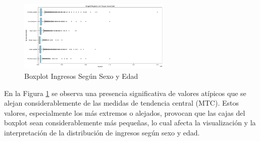 \documentclass{article}
\begin{document}
	\FloatBarrier
	
	\begin{figure}[htbp]
		\centering
		\includegraphics[width=0.65\textwidth]{../output/fig/BoxIngSexoEdad.pdf}
		\caption{\label{04fig} Boxplot Ingresos Según Sexo y Edad}
	\end{figure}
	
	\FloatBarrier
	
	En la Figura \ref{04fig} se observa una presencia significativa de valores atípicos que se alejan considerablemente de las medidas de tendencia central (MTC). Estos valores, especialmente los más extremos o alejados, provocan que las cajas del boxplot sean considerablemente más pequeñas, lo cual afecta la visualización y la interpretación de la distribución de ingresos según sexo y edad.
	
	\FloatBarrier
	
\end{document}
